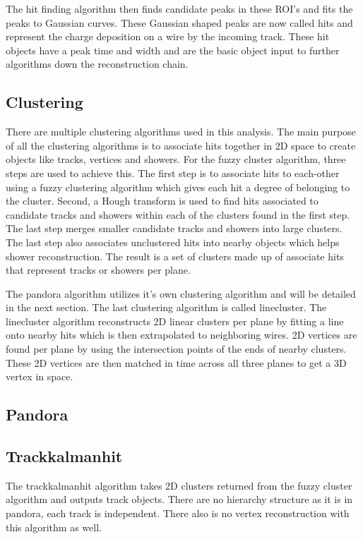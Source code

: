 The hit finding algorithm then finds candidate peaks in these ROI's and fits the peaks to Gaussian curves. These Gaussian shaped peaks are now called hits and represent the charge deposition on a wire by the incoming track. These hit objects have a peak time and width and are the basic object input to further algorithms down the reconstruction chain.   
\subsection{Clustering}
There are multiple clustering algorithms used in this analysis. The main purpose of all the clustering algorithms is to associate hits together in 2D space to create objects like tracks, vertices and showers. For the fuzzy cluster algorithm, three steps are used to achieve this. The first step is to associate hits to each-other using a fuzzy clustering algorithm which gives each hit a degree of belonging to the cluster. Second, a Hough transform is used to find hits associated to candidate tracks and showers within each of the clusters found in the first step. The last step merges smaller candidate tracks and showers into large clusters. The last step also associates unclustered hits into nearby objects which helps shower reconstruction. The result is a set of clusters made up of associate hits that represent tracks or showers per plane. 

The pandora algorithm utilizes it's own clustering algorithm and will be detailed in the next section. The last clustering algorithm is called linecluster. The linecluster algorithm reconstructs 2D linear clusters per plane by fitting a line onto nearby hits which is then extrapolated to neighboring wires. 2D vertices are found per plane by using the intersection points of the ends of nearby clusters. These 2D vertices are then matched in time across all three planes to get a 3D vertex in space.  
\subsection{Pandora}

\subsection{Trackkalmanhit}
The trackkalmanhit algorithm takes 2D clusters returned from the fuzzy cluster algorithm and outputs track objects. There are no hierarchy structure as it is in pandora, each track is independent. There also is no vertex reconstruction with this algorithm as well.
